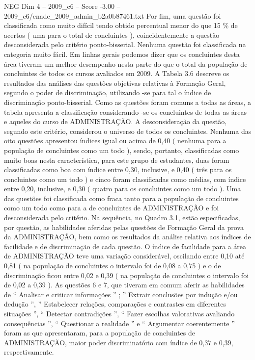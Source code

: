 \begin{textsample}{NEG Dim 4 – 2009\_c6 – Score -3.00 – 2009\_c6/enade\_2009\_admin\_b2a0b87461.txt}
Por fim, uma questão foi classificada como muito difícil tendo obtido percentual menor do que 15 \% de acertos ( uma para o total de concluintes ), coincidentemente a questão desconsiderada pelo critério ponto-bisserial.
Nenhuma questão foi classificada na categoria muito fácil.
Em linhas gerais podemos dizer que os concluintes desta área tiveram um melhor desempenho nesta parte do que o total da população de concluintes de todos os cursos avaliados em 2009.
A Tabela 3.6 descreve os resultados das análises das questões objetivas relativas à Formação Geral, segundo o poder de discriminação, utilizando -se para tal o índice de discriminação ponto-bisserial.
Como as questões foram comuns a todas as áreas, a tabela apresenta a classificação considerando -se os concluintes de todas as áreas e aqueles do curso de ADMINISTRAÇÃO.
A desconsideração da questão, segundo este critério, considerou o universo de todos os concluintes.
Nenhuma das oito questões apresentou índices igual ou acima de 0,40 ( nenhuma para a população de concluintes como um todo ), sendo, portanto, classificadas como muito boas nesta característica, para este grupo de estudantes, duas foram classificadas como boa com índice entre 0,30, inclusive, e 0,40 ( três para os concluintes como um todo ) e cinco foram classificadas como médias, com índice entre 0,20, inclusive, e 0,30 ( quatro para os concluintes como um todo ).
Uma das questões foi classificada como fraca tanto para a população de concluintes como um todo como para a de concluintes de ADMINISTRAÇÃO e foi desconsiderada pelo critério.
Na sequência, no Quadro 3.1, estão especificadas, por questão, as habilidades aferidas pelas questões de Formação Geral da prova da ADMINISTRAÇÃO, bem como os resultados da análise relativa aos índices de facilidade e de discriminação de cada questão.
O índice de facilidade para a área de ADMINISTRAÇÃO teve uma variação considerável, oscilando entre 0,10 até 0,81 ( na população de concluintes o intervalo foi de 0,08 a 0,75 ) e o de discriminação ficou entre 0,02 e 0,39 ( na população de concluintes o intervalo foi de 0,02 a 0,39 ).
As questões 6 e 7, que tiveram em comum aferir as habilidades de “ Analisar e criticar informações ” ; ” Extrair conclusões por indução e/ou dedução ”, ” Estabelecer relações, comparações e contrastes em diferentes situações ”, “ Detectar contradições ”, “ Fazer escolhas valorativas avaliando consequências ”, “ Questionar a realidade ” e “ Argumentar coerentemente ” foram as que apresentaram, para a população de concluintes de ADMINISTRAÇÃO, maior poder discriminatório com índice de 0,37 e 0,39, respectivamente.

\end{textsample}
